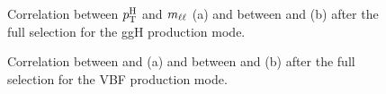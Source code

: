 \begin{figure}[htb]
\centering
{}
\caption{Correlation between $p_\mathrm{T}^\mathrm{H}$ and $m_{\ell\ell}$ (a) and between \pth and \mt (b) after the full selection for the ggH production mode.\label{fig:correlation_ggH}}
\end{figure}

\begin{figure}[htb]
\centering
{}
\caption{Correlation between \pth and \mll (a) and between \pth and \mt (b) after the full selection for the VBF production mode.\label{fig:correlation_vbf}}
\end{figure}

